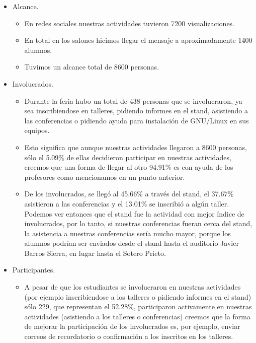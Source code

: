 \documentclass[a4paper,11pt]{article}                 %
\begin{document}
\begin{itemize}
    \begin{itemize}
    \item Alcance.
    \begin{itemize}
     \item En redes sociales nuestras actividades tuvieron 7200 visualizaciones.
      \item En total en los salones hicimos llegar el mensaje a aproximadamente 1400 alumnos.
      \hrulefill
      \item Tuvimos un alcance total de 8600 personas.
    \end{itemize}
    \item Involucrados.
    \begin{itemize}
      \item Durante la feria hubo un total de 438 personas que se involucraron, ya sea inscribiendose en talleres, pidiendo informes en el stand, asistiendo a las conferencias o pidiendo ayuda para instalación de GNU/Linux en sus equipos.
      \item Esto significa que aunque nuestras actividades llegaron a 8600 personas, sólo el 5.09\% de ellas decidieron participar en nuestras actividades, creemos que una forma de llegar al otro 94.91\% es con ayuda de los profesores como mencionamos en un punto anterior.
      \item De los involucrados, se llegó al 45.66\% a través del stand, el 37.67\% asistieron a las conferencias y el 13.01\% se inscribió a algún taller. Podemos ver entonces que el stand fue la actividad con mejor índice de involucrados, por lo tanto, si nuestras conferencias fueran cerca del stand, la asistencia a nuestras conferencias sería mucho mayor, porque los alumnos podrían ser enviados desde el stand hasta el auditorio Javier Barros Sierra, en lugar hasta el Sotero Prieto.
    \end{itemize}
    \item Participantes.
    \begin{itemize}
      \item A pesar de que los estudiantes se involucraron en nuestras actividades (por ejemplo inscribiendose a los talleres o pidiendo informes en el stand) sólo 229, que representan el 52.28\%, participaron activamente en nuestras actividades (asistiendo a los talleres o conferencias) creemos que la forma de mejorar la participación de los involucrados es, por ejemplo, enviar correos de recordatorio o confirmación a los inscritos en los talleres. 
    \end{itemize}
    \end{itemize} 

  \end{itemize}
  
\end{document}
